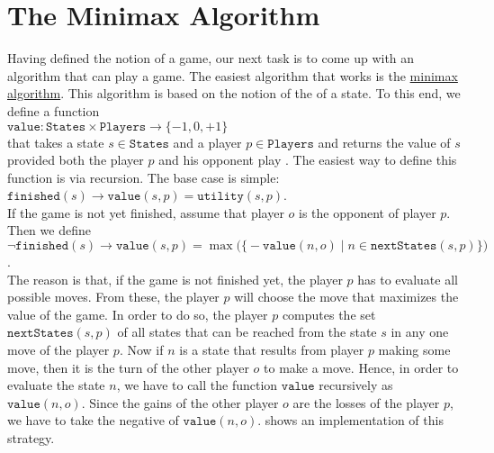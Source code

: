 \section{The Minimax Algorithm}
Having defined the notion of a game, our next task is to come up with an algorithm that can play a game.  The
easiest algorithm that works is the \href{https://en.wikipedia.org/wiki/Minimax}{minimax algorithm}.  This
algorithm is based on the notion of the  of a state.  To this end, we define a function
\\[0.2cm]
\hspace*{1.3cm}
$\texttt{value}: \texttt{States} \times \texttt{Players} \rightarrow \{-1, 0, +1\}$
\\[0.2cm]
that takes a state $s \in \texttt{States}$ and a player $p \in \texttt{Players}$ and returns the value of $s$ provided both the player $p$ and his
opponent play .  The easiest way to define this function is via recursion.  The base case is simple:
\\[0.2cm]
\hspace*{1.3cm}
$\texttt{finished}(s) \rightarrow \texttt{value}(s, p) = \texttt{utility}(s, p)$.
\\[0.2cm]
If the game is not yet finished, assume that player $o$ is the opponent of player $p$.  Then we define
\\[0.2cm]
\hspace*{1.3cm}
$\neg \texttt{finished}(s) \rightarrow 
 \texttt{value}(s, p) = \max\bigl(\bigl\{
                     -\texttt{value}(n, o) \mid n \in \texttt{nextStates}(s, p)
                     \bigr\}\bigr)
$.
\\[0.2cm]
The reason is that, if the game is not finished yet, the player $p$ has to evaluate all possible moves.  
From these, the player $p$ will choose the move that maximizes the value of the game.  In order to do so, the
player $p$ computes the set 
$\texttt{nextStates}(s, p)$ of all states that can be reached from the state $s$ in any one move of the player $p$.
Now if $n$ is a state that results from player $p$ making some move, then it is the turn of the other player
$o$ to make a move.  Hence, in order to evaluate the state $n$, we have to call the function $\texttt{value}$
recursively as $\texttt{value}(n,o)$.   Since the gains of the other player $o$ are the losses of the player
$p$, we have to take the negative of  $\texttt{value}(n, o)$.
 shows an implementation of this strategy.


